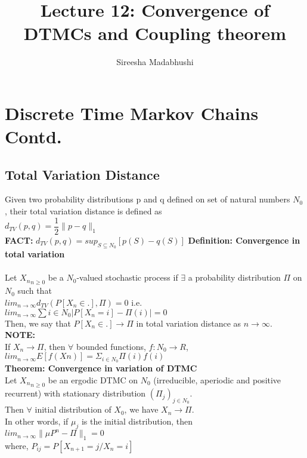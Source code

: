 \documentclass[a4paper,10pt]{article}
\title{Lecture 12: Convergence of DTMCs and Coupling theorem}
\author{Sireesha Madabhushi}
\theoremstyle{plain}
\theoremstyle{definition}
\theoremstyle{remark}
\begin{document}
\maketitle
\section{Discrete Time Markov Chains Contd.}

\subsection{Total Variation Distance}

Given two probability distributions p and q defined on set of natural numbers \textbf{$N_0$}, their total variation distance is defined as\\
$d_{TV}(p,q) = \dfrac{1}{2} \lVert p - q \rVert_1$\\
\textbf{FACT:} $d_{TV}(p,q) = sup_{S \subseteq N_0} [p(S) - q(S)]$
\textbf{Definition: Convergence in total variation\\}\\
Let ${X_n}_{n \geq 0}$ be a $N_0$-valued stochastic process if $\exists$ a probability distribution $\Pi$ on $N_0$ such that \\
$lim_{n \rightarrow \infty} d_{TV}(P[X_{n} \in .], \Pi) = 0$ i.e.\\

$lim_{n \rightarrow \infty} \sum{i \in N_{0}} \lvert P[X_{n}=i] - \Pi(i) \rvert = 0$\\
Then, we say that $P[X_{n} \in .] \rightarrow \Pi$ in total variation distance as $n \rightarrow \infty$.\\
\textbf{NOTE:}\\
If $X_{n} \rightarrow \Pi$, then $\forall$ bounded functions, $f:N_{0} \rightarrow R$, $lim_{n \rightarrow \infty} E[f(X{n})] = \Sigma_{i \in N_0} \Pi(i)f(i)$\\
\textbf{Theorem: Convergence in variation of DTMC}\\
Let ${X_n}_{n \geq 0}$ be an ergodic DTMC on $N_{0}$ (irreducible, aperiodic and positive recurrent) with stationary distribution $(\Pi_{j})_{j \in N_0}$.\\
Then $\forall$ initial distribution of $X_0$, we have $X_n \rightarrow \Pi$.\\
In other words, if $\mu_j$ is the initial distribution, then \\

 $lim_{n \rightarrow \infty} \lVert \mu P^n - \Pi \rVert_1 = 0$\\
 where, $P_{ij} = P[X_{n+1} = j/X_n = i]$\\
\end{document}
